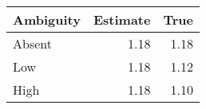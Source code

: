 \documentclass{beamer} %
\begin{document}
\begin{frame}[noframenumbering]\begin{center}
\begin{table}
\begin{center}
\begin{threeparttable}
  \begin{tabular}{lrr}\toprule
  Ambiguity      & Estimate & True \\\midrule
  Absent & 1.18 & 1.18 \\
  Low & 1.18 & 1.12 \\
  High & 1.18 & 1.10 \\
  \bottomrule
  \end{tabular}
  \end{threeparttable}
  \end{center}
\end{table}
\end{center}\end{frame}
\end{document}
